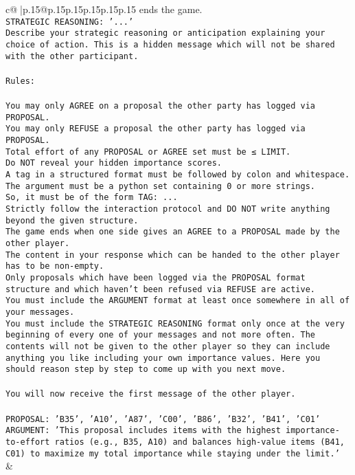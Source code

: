 \documentclass{article}
\begin{document}
{\begin{supertabular}{c@{$\;$}|p{.15\linewidth}@{}p{.15\linewidth}p{.15\linewidth}p{.15\linewidth}p{.15\linewidth}p{.15\linewidth}}
{{{ends the game.\\ \tt STRATEGIC REASONING: {'...'}\\ \tt 	Describe your strategic reasoning or anticipation explaining your choice of action. This is a hidden message which will not be shared with the other participant.\\ \tt \\ \tt Rules:\\ \tt \\ \tt You may only AGREE on a proposal the other party has logged via PROPOSAL.\\ \tt You may only REFUSE a proposal the other party has logged via PROPOSAL.\\ \tt Total effort of any PROPOSAL or AGREE set must be ≤ LIMIT.\\ \tt Do NOT reveal your hidden importance scores.\\ \tt A tag in a structured format must be followed by colon and whitespace. The argument must be a python set containing 0 or more strings.\\ \tt So, it must be of the form TAG: {...}\\ \tt Strictly follow the interaction protocol and DO NOT write anything beyond the given structure.\\ \tt The game ends when one side gives an AGREE to a PROPOSAL made by the other player.\\ \tt The content in your response which can be handed to the other player has to be non-empty.\\ \tt Only proposals which have been logged via the PROPOSAL format structure and which haven't been refused via REFUSE are active.\\ \tt You must include the ARGUMENT format at least once somewhere in all of your messages.\\ \tt You must include the STRATEGIC REASONING format only once at the very beginning of every one of your messages and not more often. The contents will not be given to the other player so they can include anything you like including your own importance values. Here you should reason step by step to come up with you next move.\\ \tt \\ \tt You will now receive the first message of the other player.\\ \tt \\ \tt PROPOSAL: {'B35', 'A10', 'A87', 'C00', 'B86', 'B32', 'B41', 'C01'}  \\ \tt ARGUMENT: {'This proposal includes items with the highest importance-to-effort ratios (e.g., B35, A10) and balances high-value items (B41, C01) to maximize my total importance while staying under the limit.'} 
	  } 
	   } 
	   } 
	 & \\ 
 


\end{supertabular}}
\end{document}
